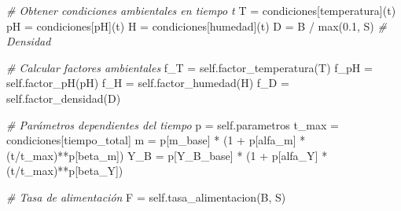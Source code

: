 \documentclass[
]{article}
\newenvironment{Shaded}{}{}
\newcommand{\BuiltInTok}[1]{\textcolor[rgb]{0.00,0.50,0.00}{#1}}
\newcommand{\CommentTok}[1]{\textcolor[rgb]{0.38,0.63,0.69}{\textit{#1}}}
\newcommand{\DecValTok}[1]{\textcolor[rgb]{0.25,0.63,0.44}{#1}}
\newcommand{\FloatTok}[1]{\textcolor[rgb]{0.25,0.63,0.44}{#1}}
\newcommand{\NormalTok}[1]{#1}
\newcommand{\OperatorTok}[1]{\textcolor[rgb]{0.40,0.40,0.40}{#1}}
\newcommand{\StringTok}[1]{\textcolor[rgb]{0.25,0.44,0.63}{#1}}
\newcommand{\VariableTok}[1]{\textcolor[rgb]{0.10,0.09,0.49}{#1}}
\begin{document}
\begin{Shaded}
\begin{Highlighting}[]
        \CommentTok{\# Obtener condiciones ambientales en tiempo t}
\NormalTok{        T }\OperatorTok{=}\NormalTok{ condiciones[}\StringTok{\textquotesingle{}temperatura\textquotesingle{}}\NormalTok{](t)}
\NormalTok{        pH }\OperatorTok{=}\NormalTok{ condiciones[}\StringTok{\textquotesingle{}pH\textquotesingle{}}\NormalTok{](t)}
\NormalTok{        H }\OperatorTok{=}\NormalTok{ condiciones[}\StringTok{\textquotesingle{}humedad\textquotesingle{}}\NormalTok{](t)}
\NormalTok{        D }\OperatorTok{=}\NormalTok{ B }\OperatorTok{/} \BuiltInTok{max}\NormalTok{(}\FloatTok{0.1}\NormalTok{, S)  }\CommentTok{\# Densidad}
        
        \CommentTok{\# Calcular factores ambientales}
\NormalTok{        f\_T }\OperatorTok{=} \VariableTok{self}\NormalTok{.factor\_temperatura(T)}
\NormalTok{        f\_pH }\OperatorTok{=} \VariableTok{self}\NormalTok{.factor\_pH(pH)}
\NormalTok{        f\_H }\OperatorTok{=} \VariableTok{self}\NormalTok{.factor\_humedad(H)}
\NormalTok{        f\_D }\OperatorTok{=} \VariableTok{self}\NormalTok{.factor\_densidad(D)}
        
        \CommentTok{\# Parámetros dependientes del tiempo}
\NormalTok{        p }\OperatorTok{=} \VariableTok{self}\NormalTok{.parametros}
\NormalTok{        t\_max }\OperatorTok{=}\NormalTok{ condiciones[}\StringTok{\textquotesingle{}tiempo\_total\textquotesingle{}}\NormalTok{]}
\NormalTok{        m }\OperatorTok{=}\NormalTok{ p[}\StringTok{\textquotesingle{}m\_base\textquotesingle{}}\NormalTok{] }\OperatorTok{*}\NormalTok{ (}\DecValTok{1} \OperatorTok{+}\NormalTok{ p[}\StringTok{\textquotesingle{}alfa\_m\textquotesingle{}}\NormalTok{] }\OperatorTok{*}\NormalTok{ (t}\OperatorTok{/}\NormalTok{t\_max)}\OperatorTok{**}\NormalTok{p[}\StringTok{\textquotesingle{}beta\_m\textquotesingle{}}\NormalTok{])}
\NormalTok{        Y\_B }\OperatorTok{=}\NormalTok{ p[}\StringTok{\textquotesingle{}Y\_B\_base\textquotesingle{}}\NormalTok{] }\OperatorTok{*}\NormalTok{ (}\DecValTok{1} \OperatorTok{+}\NormalTok{ p[}\StringTok{\textquotesingle{}alfa\_Y\textquotesingle{}}\NormalTok{] }\OperatorTok{*}\NormalTok{ (t}\OperatorTok{/}\NormalTok{t\_max)}\OperatorTok{**}\NormalTok{p[}\StringTok{\textquotesingle{}beta\_Y\textquotesingle{}}\NormalTok{])}
        
        \CommentTok{\# Tasa de alimentación}
\NormalTok{        F }\OperatorTok{=} \VariableTok{self}\NormalTok{.tasa\_alimentacion(B, S)}
        

\end{Highlighting}
\end{Shaded}
\end{document}
